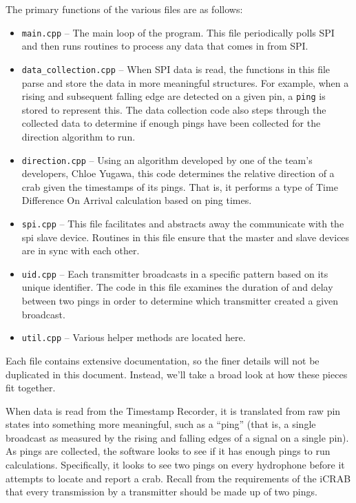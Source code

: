 \documentclass[12pt]{article}
\begin{document}
The primary functions of the various files are as follows:
\begin{itemize}
\item \texttt{main.cpp} --
	The main loop of the program. This file periodically polls SPI and
	then runs routines to process any data that comes in from SPI.
\item \texttt{data\_collection.cpp} --
	When SPI data is read, the functions in this file parse and store the
	data in more meaningful structures.
	For example, when a rising and subsequent falling edge are detected on a
	given pin, a \texttt{ping} is stored to represent this.
	The data collection code also steps through the collected data to determine
	if enough pings have been collected for the direction algorithm to run.
\item \texttt{direction.cpp} --
	Using an algorithm developed by one of the team's developers, Chloe Yugawa,
	this code determines the relative direction of a crab given the timestamps
	of its pings.
	That is, it performs a type of Time Difference On Arrival calculation
	based on ping times.
\item \texttt{spi.cpp} --
	This file facilitates and abstracts away the communicate with the
	\gls{spi} slave device.
	Routines in this file ensure that the master and slave devices are in
	sync with each other.
\item \texttt{uid.cpp} --
	Each transmitter broadcasts in a specific pattern based on its unique
	identifier. The code in this file examines the duration of and delay
	between two pings in order to determine which transmitter created a
	given broadcast.
\item \texttt{util.cpp} --
	Various helper methods are located here.
\end{itemize}

Each file contains extensive documentation, so the finer details will not be
duplicated in this document. Instead, we'll take a broad look at how these
pieces fit together.

When data is read from the Timestamp Recorder, it is translated from raw pin
states into something more meaningful, such as a ``ping'' (that is, a single
broadcast as measured by the rising and falling edges of a signal on a single
pin).
As pings are collected, the software looks to see if it has enough pings to
run calculations.
Specifically, it looks to see two pings on every hydrophone before it attempts
to locate and report a crab.
Recall from the requirements of the \gls{iCRAB} that every transmission by
a transmitter should be made up of two pings.
\end{document}
